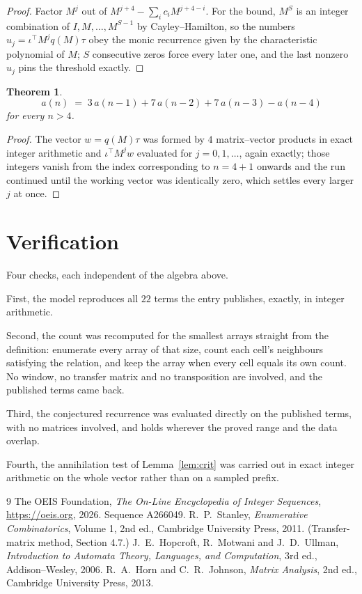 \documentclass[11pt,a4paper]{article}
\theoremstyle{plain}
\newtheorem{theorem}{Theorem}
\theoremstyle{definition}
\begin{document}
\begin{proof}
Factor $M^{j}$ out of $M^{j+4}-\sum_ic_iM^{j+4-i}$. For the bound, $M^{S}$
is an integer combination of $I,M,\dots,M^{S-1}$ by Cayley--Hamilton, so the numbers
$u_j=\iota^{\!\top}M^{j}q(M)\tau$ obey the monic recurrence given by the characteristic
polynomial of $M$; $S$ consecutive zeros force every later one, and the last nonzero $u_j$
pins the threshold exactly.
\end{proof}

\begin{theorem}
\[
a(n)\;=\;3\,a(n-1) + 7\,a(n-2) + 7\,a(n-3) - a(n-4)
\]
for every $n>4$.
\end{theorem}

\begin{proof}
The vector $w=q(M)\tau$ was formed by $4$ matrix--vector products in exact integer
arithmetic and $\iota^{\!\top}M^{j}w$ evaluated for $j=0,1,\dots$, again exactly; those
integers vanish from the index corresponding to $n=4+1$ onwards and the run continued
until the working vector was identically zero, which settles every larger $j$ at once.
\end{proof}

\section{Verification}

Four checks, each independent of the algebra above.

First, the model reproduces all $22$ terms the entry publishes, exactly, in integer
arithmetic.

Second, the count was recomputed for the smallest arrays straight from the definition:
enumerate every array of that size, count each cell's neighbours satisfying the relation, and
keep the array when every cell equals its own count. No window, no transfer matrix and no
transposition are involved, and the published terms came back.

Third, the conjectured recurrence was evaluated directly on the published terms, with no
matrices involved, and holds wherever the proved range and the data overlap.

Fourth, the annihilation test of Lemma~\ref{lem:crit} was carried out in exact integer
arithmetic on the whole vector rather than on a sampled prefix.

\begin{thebibliography}{9}
 The OEIS Foundation, \emph{The On-Line Encyclopedia of Integer
Sequences}, \url{https://oeis.org}, 2026. Sequence A266049.
 R.~P.~Stanley, \emph{Enumerative Combinatorics}, Volume 1, 2nd ed.,
Cambridge University Press, 2011. (Transfer-matrix method, Section 4.7.)
 J.~E.~Hopcroft, R.~Motwani and J.~D.~Ullman, \emph{Introduction to Automata
Theory, Languages, and Computation}, 3rd ed., Addison--Wesley, 2006.
 R.~A.~Horn and C.~R.~Johnson, \emph{Matrix Analysis}, 2nd ed., Cambridge
University Press, 2013.
\end{thebibliography}
\end{document}
